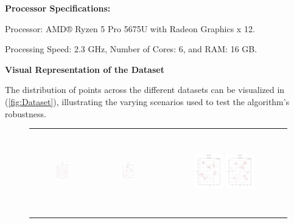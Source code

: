 \vspace*{6mm}  

\textbf{Processor Specifications:}


Processor: AMD® Ryzen 5 Pro 5675U with Radeon Graphics x 12.


Processing Speed: 2.3 GHz, Number of Cores: 6, and RAM: 16 GB.


\vspace*{6mm}  

\textbf{Visual Representation of the Dataset}

The distribution of points across the different datasets can be visualized in (\autoref{fig:Dataset}), illustrating the varying scenarios used to test the algorithm's robustness.


\begin{figure}[p]
    \centering
    \begin{tabular}{ccc}
         \includegraphics[height=36mm,width=0.24\textwidth]{Images/data/01.png}
        & \includegraphics[height=36mm,width=0.24\textwidth]{Images/data/02.png}
        & \includegraphics[height=36mm,width=0.24\textwidth]{Images/data/03.png}
         \includegraphics[height=36mm,width=0.24\textwidth]{Images/data/04.png}\\[-4pt]


\end{tabular}
\end{figure}
